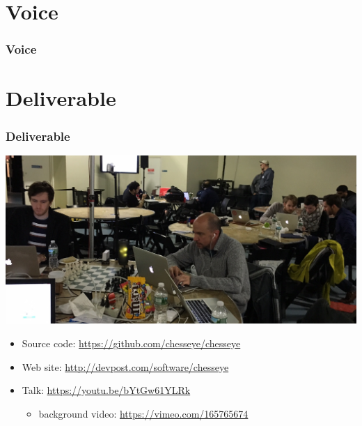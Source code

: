 \documentclass[t]{beamer}
\begin{document}
\section{Voice}

\begin{frame}[fragile]
\frametitle{Voice}


\end{frame}

\section{Deliverable}

\begin{frame}[fragile]
\frametitle{Deliverable}

\begin{center}
  \includegraphics[scale=0.15]{figures/photo-deliverable}
\end{center}

\begin{itemize}
\item Source code: \url{https://github.com/chesseye/chesseye}
  \medskip
\item Web site: \url{http://devpost.com/software/chesseye}
  \medskip
\item Talk: \url{https://youtu.be/bYtGw61YLRk}
  \begin{itemize}
  \item background video: \url{https://vimeo.com/165765674}
  \end{itemize}
\end{itemize}


\end{frame}
\end{document}
